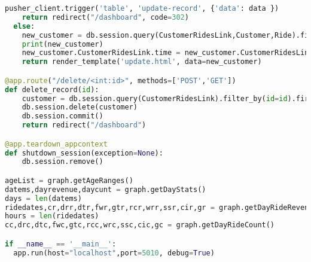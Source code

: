 \begin{lstlisting}[language=Python]
    pusher_client.trigger('table', 'update-record', {'data': data })
    return redirect("/dashboard", code=302)
  else:
    new_customer = db.session.query(CustomerRidesLink,Customer,Ride).filter_by(id=id,customerId=Customer.id,rideId=Ride.id).first()
    print(new_customer)
    new_customer.CustomerRidesLink.time = new_customer.CustomerRidesLink.time.strftime("%d-%m-%Y %H:%M")
    return render_template('update.html', data=new_customer)

@app.route("/delete/<int:id>", methods=['POST','GET'])
def delete_record(id):
    customer = db.session.query(CustomerRidesLink).filter_by(id=id).first()
    db.session.delete(customer)
    db.session.commit()
    return redirect("/dashboard")

@app.teardown_appcontext
def shutdown_session(exception=None):
    db.session.remove()

ageList = graph.getAgeRanges()
datems,dayrevenue,daycunt = graph.getDayStats()
days = len(datems)
ridedates,cr,drr,dtr,fwr,gtr,rcr,wrr,ssr,cir,gr = graph.getDayRideRevenue()
hours = len(ridedates)
cc,drc,dtc,fwc,gtc,rcc,wrc,ssc,cic,gc = graph.getDayRideCount()

if __name__ == '__main__':
  app.run(host="localhost",port=5010, debug=True)
\end{lstlisting}

